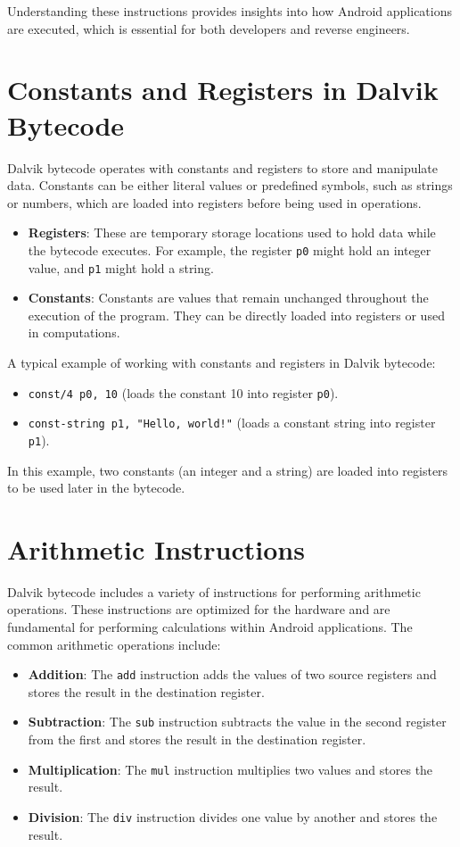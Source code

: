 \documentclass{article}
\begin{document}
Understanding these instructions provides insights into how Android applications are executed, which is essential for both developers and reverse engineers.

\section{Constants and Registers in Dalvik Bytecode}
Dalvik bytecode operates with constants and registers to store and manipulate data. Constants can be either literal values or predefined symbols, such as strings or numbers, which are loaded into registers before being used in operations.

\begin{itemize}
    \item \textbf{Registers}: These are temporary storage locations used to hold data while the bytecode executes. For example, the register \texttt{p0} might hold an integer value, and \texttt{p1} might hold a string.
    \item \textbf{Constants}: Constants are values that remain unchanged throughout the execution of the program. They can be directly loaded into registers or used in computations.
\end{itemize}

A typical example of working with constants and registers in Dalvik bytecode:

\begin{itemize}
    \item \texttt{const/4 p0, 10} (loads the constant 10 into register \texttt{p0}).
    \item \texttt{const-string p1, "Hello, world!"} (loads a constant string into register \texttt{p1}).
\end{itemize}

In this example, two constants (an integer and a string) are loaded into registers to be used later in the bytecode.

\section{Arithmetic Instructions}
Dalvik bytecode includes a variety of instructions for performing arithmetic operations. These instructions are optimized for the hardware and are fundamental for performing calculations within Android applications. The common arithmetic operations include:

\begin{itemize}
    \item \textbf{Addition}: The \texttt{add} instruction adds the values of two source registers and stores the result in the destination register.
    \item \textbf{Subtraction}: The \texttt{sub} instruction subtracts the value in the second register from the first and stores the result in the destination register.
    \item \textbf{Multiplication}: The \texttt{mul} instruction multiplies two values and stores the result.
    \item \textbf{Division}: The \texttt{div} instruction divides one value by another and stores the result.
\end{itemize}
\end{document}
